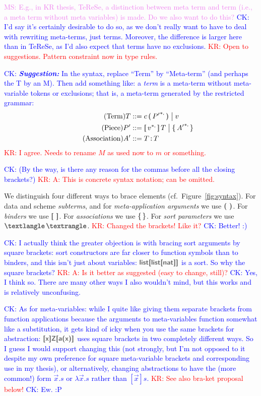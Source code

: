 \documentclass[letterpaper,11pt]{article}
\newcommand{\CK}[1]{\textcolor{blue}{CK: #1}}
\newcommand{\KR}[1]{\textcolor{red}{KR: #1}}
\newcommand{\MS}[1]{\textcolor{violet}{MS: #1}}
\begin{document}
\MS{E.g., in KR thesis, TeReSe, a distinction between meta term and term (i.e., a meta term without
  meta variables) is made. Do we also want to do this?}  \CK{I'd say it's certainly desirable to do
  so, as we don't really want to have to deal with rewriting meta-terms, just terms.  Moreover, the
  difference is larger here than in TeReSe, as I'd also expect that terms have no exclusions.}
\KR{Open to suggestions. Pattern constraint now in type rules.}

\CK{
  \textbf{\emph{Suggestion:}}
  In the syntax, replace ``Term'' by ``Meta-term'' (and perhaps the T by an M).  Then add
  something like: a \emph{term} is a meta-term without meta-variable tokens or exclusions; that
  is, a meta-term generated by the restricted grammar:
  \begin{align}
    \tag{Term}
    T &::= c\,\kw(\,{P'}^{*\kw,}\,\kw)
    \bigm| v
    \\
    \tag{Piece}
    P' &::= \kw[\,v^{*\kw,}\,\kw]\,T
    \bigm| \kwm\{\, {A'}^{*\kw,} \,\kwm\}
    \\
    \tag{Association}
    A' &::= T\,\kw:\,T
  \end{align}
}
\KR{I agree. Needs to rename $M$ as used now to $m$ or something.}

\CK{(By the way, is there any reason for the commas before all the closing brackets?)}
\KR{A: This is concrete syntax notation; can be omitted.}


We distinguish four different ways to brace elements (cf.\ Figure~\ref{fig:syntax}). For data and
scheme \emph{subterms}, and for \emph{meta-application arguments} we use $\kw{( )}$.
For \emph{binders} we use $\kw{[ ]}$.
For \emph{associations} we use $\kwm{\{\,\}}$.
For \emph{sort parameters} we use $\kwm{⟨\,⟩}$.
\KR{Changed the brackets! Like it?}
\CK{Better! :)}

\CK{I actually think the greater objection is with bracing sort arguments by
  square brackets: sort constructors are far closer to function symbols than to
  binders, and this isn't just about variables: $\kw{list[list[nat]]}$ is a
  sort.  So why the square brackets?} \KR{A: Is it better as suggested (easy to change, still)?}
  \CK{Yes, I think so.  There are many other ways I also wouldn't mind, but this
  works and is relatively unconfusing.}

\CK{As for meta-variables: while I quite like giving them separate brackets
  from function applications because the arguments to meta-variables function
  somewhat like a substitution, it gets kind of icky when you use the same
  brackets for abstraction: $\kw{[x]Z[a(x)]}$ uses square brackets in two
  completely different ways.  So I guess I would support changing this (not
  strongly, but I'm not opposed to it despite my own preference for square
  meta-variable brackets and corresponding use in my thesis), or alternatively,
  changing abstractions to have the (more common!) form $\vec{x}.s$ or
  $\lambda \vec{x}.s$ rather than $[\vec{x}]s$.} \KR{See also bra-ket proposal below!}
  \CK{Ew. :P}
\end{document}
